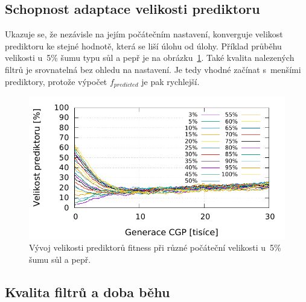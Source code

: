 \documentclass[czech]{ExcelAtFIT} %
\begin{document}
\subsection{Schopnost adaptace velikosti prediktoru}

Ukazuje se, že nezávisle na jejím počátečním nastavení, konverguje velikost prediktoru ke stejné hodnotě, která se liší úlohu od úlohy. Příklad průběhu velikosti u~5\% šumu typu sůl a pepř je na obrázku~\ref{fig:InitialSize}. Také kvalita nalezených filtrů je srovnatelná bez ohledu na nastavení. Je tedy vhodné začínat s~men\-šími pre\-dik\-tory, protože výpočet $f_\mathit{predicted}$ je pak rychlejší.


\begin{figure}[htb]
    \centering
    \includegraphics[width=\linewidth]{images/initial-size-5-30kg.pdf}
    \caption{Vývoj velikosti prediktorů fitness při různé počáteční velikosti u~5\% šumu sůl a pepř.}
    \label{fig:InitialSize}
\end{figure}

\subsection{Kvalita filtrů a doba běhu}
\end{document}
